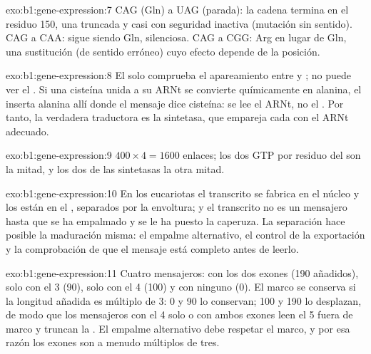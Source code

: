 \begin{solution}{exo:b1:gene-expression:7}
CAG (Gln) a UAG (parada): la cadena termina en el residuo 150, una 
truncada y casi con seguridad inactiva (mutación sin sentido). CAG a CAA:
sigue siendo Gln, silenciosa. CAG a CGG: Arg en lugar de Gln, una sustitución
(de sentido erróneo) cuyo efecto depende de la posición.
\end{solution}

\begin{solution}{exo:b1:gene-expression:8}
El  solo comprueba el apareamiento entre  y ; no puede
ver el . Si una cisteína unida a su ARNt se convierte
químicamente en alanina, el  inserta alanina allí donde el mensaje
dice cisteína: se lee el ARNt, no el . Por tanto, la verdadera
traductora es la sintetasa, que empareja cada  con el ARNt
adecuado.
\end{solution}

\begin{solution}{exo:b1:gene-expression:9}
$400\times 4 = 1600$ enlaces; los dos GTP por residuo del  son la
mitad, y los dos de las sintetasas la otra mitad.
\end{solution}

\begin{solution}{exo:b1:gene-expression:10}
En los eucariotas el transcrito se fabrica en el núcleo y los 
están en el , separados por la envoltura; y el transcrito no es un
mensajero hasta que se ha empalmado y se le ha puesto la caperuza. La
separación hace posible la maduración misma: el empalme alternativo, el
control de la exportación y la comprobación de que el mensaje está completo
antes de leerlo.
\end{solution}

\begin{solution}{exo:b1:gene-expression:11}
Cuatro mensajeros: con los dos exones (190  añadidos), solo con
el 3 (90), solo con el 4 (100) y con ninguno (0). El marco se conserva si la
longitud añadida es múltiplo de 3: 0 y 90 lo conservan; 100 y 190 lo
desplazan, de modo que los mensajeros con el  4 solo o con ambos exones
leen el  5 fuera de marco y truncan la . El empalme alternativo
debe respetar el marco, y por esa razón los exones son a menudo múltiplos de
tres.
\end{solution}

